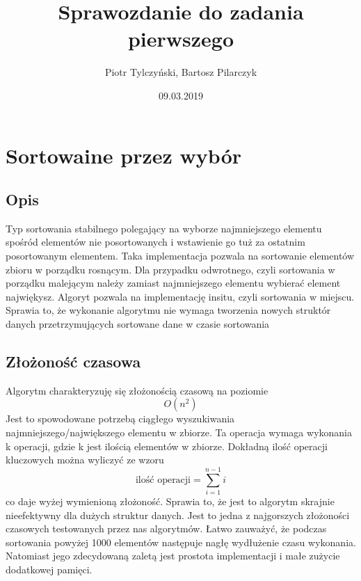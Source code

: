 \documentclass[]{article}
\title{Sprawozdanie do zadania pierwszego}
\author{Piotr Tylczyński, Bartosz Pilarczyk}
\date{09.03.2019}
\begin{document}
\maketitle

\section{Sortowaine przez wybór}
	\subsection{Opis}
		Typ sortowania stabilnego polegający na wyborze najmniejszego elementu spośród elementów nie posortowanych i wstawienie go tuż za ostatnim posortowanym elementem. Taka implementacja pozwala na sortowanie elementów zbioru w porządku rosnącym. Dla przypadku odwrotnego, czyli sortowania w porządku malejącym należy zamiast najmniejszego elementu wybierać element najwiękysz. Algoryt pozwala na implementację insitu, czyli sortowania w miejscu. Sprawia to, że wykonanie algorytmu nie wymaga tworzenia nowych struktór danych przetrzymujących sortowane dane w czasie sortowania
	\subsection{Złożoność czasowa}
		Algorytm charakteryzuję się złożonością czasową na poziomie
		\[
			O(n^2)
		\]
		Jest to spowodowane potrzebą ciągłego wyszukiwania najmniejszego/największego elementu w zbiorze. Ta operacja wymaga wykonania k operacji, gdzie k jest ilością elementów  w zbiorze. Dokładną ilość operacji kluczowych można wyliczyć ze wzoru
		\[
			\text{ilość operacji} = \sum_{i = 1}^{n - 1}{i}
		\]
		co daje wyżej wymienioną złożoność.
		Sprawia to, że jest to algorytm skrajnie nieefektywny dla dużych struktur danych. Jest to jedna z najgorszych złożoności czasowych testowanych przez nas algorytmów. Łatwo zauważyć, że podczas sortowania powyżej 1000 elementów następuje nagłę wydłużenie czasu wykonania. Natomiast jego zdecydowaną zaletą jest prostota implementacji i małe zużycie dodatkowej pamięci.
		
	 	
\end{document}
